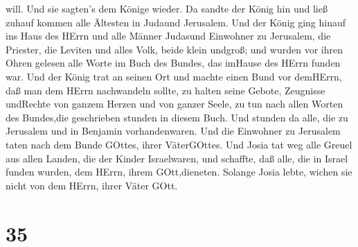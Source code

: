 will. Und sie sagten's dem Könige wieder.  Da sandte der
König hin und ließ zuhauf kommen alle Ältesten in Judaund Jerusalem.
 Und der König ging hinauf ins Haus des HErrn und alle
Männer Judasund Einwohner zu Jerusalem, die Priester, die Leviten und
alles Volk, beide klein undgroß; und wurden vor ihren Ohren gelesen alle
Worte im Buch des Bundes, das imHause des HErrn funden war.
 Und der König trat an seinen Ort und machte einen Bund vor
demHErrn, daß man dem HErrn nachwandeln sollte, zu halten seine Gebote,
Zeugnisse undRechte von ganzem Herzen und von ganzer Seele, zu tun nach
allen Worten des Bundes,die geschrieben stunden in diesem Buch.
 Und stunden da alle, die zu Jerusalem und in Benjamin
vorhandenwaren. Und die Einwohner zu Jerusalem taten nach dem Bunde
GOttes, ihrer VäterGOttes.  Und Josia tat weg alle Greuel
aus allen Landen, die der Kinder Israelwaren, und schaffte, daß alle,
die in Israel funden wurden, dem HErrn, ihrem GOtt,dieneten. Solange
Josia lebte, wichen sie nicht von dem HErrn, ihrer Väter GOtt.

\hypertarget{section-34}{%
\section{35}\label{section-34}}


